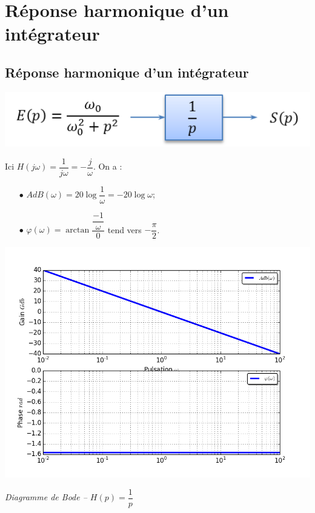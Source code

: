 \documentclass[10pt,oneside]{article}
\begin{document}
\section{Réponse harmonique d'un intégrateur}

\subsection{Réponse harmonique d'un intégrateur}
\begin{minipage}[c]{.48\linewidth}
\begin{center}
\includegraphics[width=.9\textwidth]{png/integrateur_bloc}
\end{center}

Ici $H(j\omega)=\dfrac{1}{j\omega}=-\dfrac{j}{\omega}$. On a :
\begin{itemize}
\item [$\bullet$] $AdB(\omega)=20 \log \dfrac{1}{\omega}=-20\log \omega$;
\item [$\bullet$] $\varphi(\omega)= \arctan \dfrac{\dfrac{-1}{\omega}}{0}$ tend vers $-\dfrac{\pi}{2}$.
\end{itemize}

\end{minipage}\hfill
\begin{minipage}[c]{.48\linewidth}
\begin{center}
\includegraphics[width=.9\textwidth]{png/integrateur_bode}

\textit{Diagramme de Bode -- $H(p)=\dfrac{1}{p}$}
\end{center}
\end{minipage}
\end{document}
